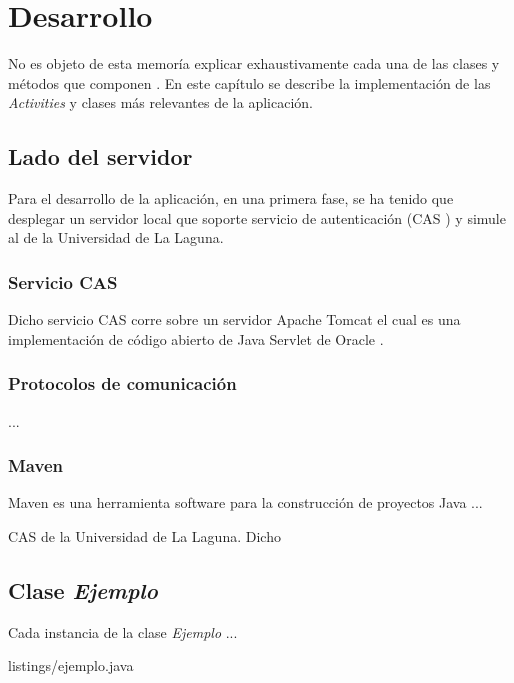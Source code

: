 %
%
%
%
\chapter{Desarrollo} \label{chap:Desarrollo}  

No es objeto de esta memoría explicar exhaustivamente cada una de las clases y métodos que componen \App{}.
En este capítulo se describe la implementación de las \textit{Activities} y clases más relevantes de la aplicación. 

\section{Lado del servidor}
Para el desarrollo de la aplicación, en una primera fase, se ha tenido que desplegar un servidor local que soporte 
servicio de autenticación (CAS \cite{URL::CAS}) y simule al de la Universidad de La Laguna. 

\subsection{Servicio CAS}
Dicho servicio CAS \cite{URL::CAS} corre sobre un servidor Apache Tomcat \cite {URL::Tomcat} el cual es una implementación 
de código abierto de Java Servlet \cite{URL::JavaServlet} de Oracle \cite{URL::Oracle}.

\subsection{Protocolos de comunicación}
...
\subsection{Maven}
Maven \cite{URL::Maven} es una herramienta software para la construcción de proyectos Java \cite{URL::Java}...

CAS \cite{URL::CAS} de la Universidad de La Laguna. Dicho 

\section{Clase \textit{Ejemplo}}

Cada instancia de la clase \textit{Ejemplo} ...


{listings/ejemplo.java} %
